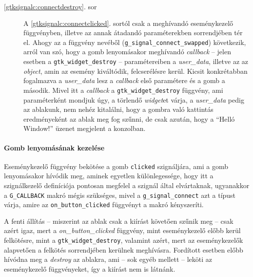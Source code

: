 \begin{description}
 \item[\ref{gtksignalc:connectdestroy}. sor] A \ref{gtksignalc:connectclicked}. sortól csak a meghívandó eseménykezelő függvényben, illetve az annak átadandó paraméterekben sorrendjében tér el. Ahogy az a függvény nevéből (\texttt{g\_signal\_connect\_swapped}) következik, arról van szó, hogy a gomb lenyomásakor meghívandó \textit{callback} -- jelen esetben a \texttt{gtk\_widget\_destroy} -- paramétereiben a \textit{user\_data}, illetve az az \textit{object}, amin az esemény kiváltódik, felcserélésre kerül. Kicsit konkrétabban fogalmazva a \textit{user\_data} lesz a \textit{callback} első paramétere és a gomb a második. Mivel itt a \textit{callback} a \texttt{gtk\_widget\_destroy} függvény, ami paraméterként mondjuk úgy, a törlendő \textit{widget}et várja, a \textit{user\_data} pedig az ablakunk, nem nehéz kitalálni, hogy a gombra való kattintás eredményeként az ablak meg fog szűnni, de csak azután, hogy a ``Helló Window!'' üzenet megjelent a konzolban.
\end{description}

\paragraph{Gomb lenyomásának kezelése}

\begin{description}
 \item[\ref{gtksignalc:connectclicked}. sor] Eseménykezelő függvény bekötése a gomb \texttt{clicked} szignáljára, ami a gomb lenyomásakor hívódik meg, aminek egyetlen különlegessége, hogy itt a szignálkezelő definíciója pontosan megfelel a szignál által elvártaknak, ugyanakkor a \texttt{G\_CALLBACK} makró mégis szükséges, mivel a \texttt{g\_signal\_connect} azt a típust várja, amire az \texttt{on\_button\_clicked} függvényt a makró kényszeríti.

 \item[\ref{gtksignalc:callbackbuttonclicked}. sor] A fenti állítás -- miszerint az ablak csak a kiírást követően szűnik meg -- csak azért igaz, mert a \textit{on\_button\_clicked} függvény, mint eseménykezelő előbb kerül felkötésre, mint a \texttt{gtk\_widget\_destroy}, valamint azért, mert az eseménykezelők alapvetően a felkötés sorrendjében kerülnek meghívásra. Fordított esetben előbb hívódna meg a \textit{destroy} az ablakra, ami -- sok egyéb mellett -- leköti az eseménykezelő függvényeket, így a kiírást nem is látnánk.
\end{description}


